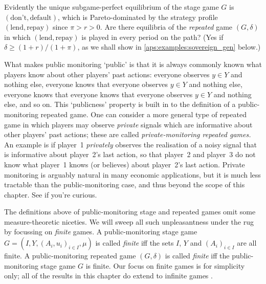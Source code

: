 \begin{example}
	Evidently the unique subgame-perfect equilibrium of the stage game $G$ is $(\text{don't},\text{default})$, which is Pareto-dominated by the strategy profile $(\text{lend},\text{repay})$ since $\pi > r > 0$. Are there equilibria of the \emph{repeated} game $(G,\delta)$ in which $(\text{lend},\text{repay})$ is played in every period on the path? (Yes if $\delta \geq (1+r)/(1+\pi)$, as we shall show in \cref{aps:examples:sovereign_gen} below.)
\end{example}

What makes public monitoring `public' is that it is always commonly known what players know about other players' past actions: everyone observes $y \in Y$ and nothing else, everyone knows that everyone observes $y \in Y$ and nothing else, everyone knows that everyone knows that everyone observes $y \in Y$ and nothing else, and so on. This `publicness' property is built in to the definition of a public-monitoring repeated game. One can consider a more general type of repeated game in which players may observe \emph{private} signals which are informative about other players' past actions; these are called \emph{private-monitoring repeated games.} An example is if player~1 \emph{privately} observes the realisation of a noisy signal that is informative about player~2's last action, so that player~2 and player~3 do not know what player~1 knows (or believes) about player~2's last action. Private monitoring is arguably natural in many economic applications, but it is much less tractable than the public-monitoring case, and thus beyond the scope of this chapter. See \textcite[][chapters~12--14]{MailathSamuelson2006} if you're curious.

The definitions above of public-monitoring stage and repeated games omit some measure-theoretic niceties. We will sweep all such unpleasantness under the rug by focussing on \emph{finite} games. A public-monitoring stage game $G = \left( I, Y, (A_i, u_i)_{i \in I}, \mu \right)$ is called \emph{finite} iff the sets $I$, $Y$ and $(A_i)_{i \in I}$ are all finite. A public-monitoring repeated game $(G,\delta)$ is called \emph{finite} iff the public-monitoring stage game $G$ is finite. Our focus on finite games is for simplicity only; all of the results in this chapter do extend to infinite games \parencite[see][chapter~7]{MailathSamuelson2006}.

